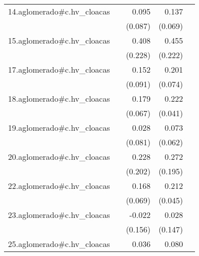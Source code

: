 {\begin{longtable}{l*{4}{D{.}{.}{-1}}}
\addlinespace
14.aglomerado#c.hv\_cloacas&                     &       0.095         &       0.137\sym{*}  &                     \\
            &                     &     (0.087)         &     (0.069)         &                     \\
\addlinespace
15.aglomerado#c.hv\_cloacas&                     &       0.408         &       0.455\sym{*}  &                     \\
            &                     &     (0.228)         &     (0.222)         &                     \\
\addlinespace
17.aglomerado#c.hv\_cloacas&                     &       0.152         &       0.201\sym{**} &                     \\
            &                     &     (0.091)         &     (0.074)         &                     \\
\addlinespace
18.aglomerado#c.hv\_cloacas&                     &       0.179\sym{**} &       0.222\sym{***}&                     \\
            &                     &     (0.067)         &     (0.041)         &                     \\
\addlinespace
19.aglomerado#c.hv\_cloacas&                     &       0.028         &       0.073         &                     \\
            &                     &     (0.081)         &     (0.062)         &                     \\
\addlinespace
20.aglomerado#c.hv\_cloacas&                     &       0.228         &       0.272         &                     \\
            &                     &     (0.202)         &     (0.195)         &                     \\
\addlinespace
22.aglomerado#c.hv\_cloacas&                     &       0.168\sym{*}  &       0.212\sym{***}&                     \\
            &                     &     (0.069)         &     (0.045)         &                     \\
\addlinespace
23.aglomerado#c.hv\_cloacas&                     &      -0.022         &       0.028         &                     \\
            &                     &     (0.156)         &     (0.147)         &                     \\
\addlinespace
25.aglomerado#c.hv\_cloacas&                     &       0.036         &       0.080         &                     \\

\end{longtable}}
